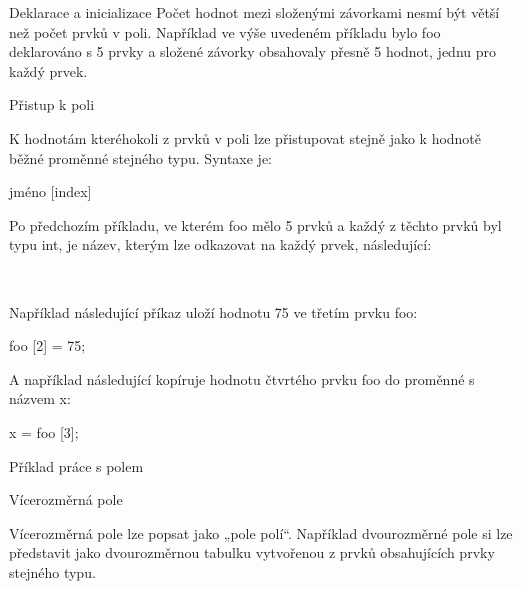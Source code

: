 \documentclass{beamer}
\begin{document}
\begin{frame}{Deklarace a inicializace}
    Počet hodnot mezi složenými závorkami nesmí být větší než počet prvků v poli. Například ve výše uvedeném příkladu bylo foo deklarováno s 5 prvky a složené závorky obsahovaly přesně 5 hodnot, jednu pro každý prvek.
\end{frame}

\begin{frame}{Přistup k poli}
    \begin{flushleft}
    K hodnotám kteréhokoli z prvků v poli lze přistupovat stejně jako k hodnotě běžné proměnné stejného typu. Syntaxe je:
        \begin{center}
            jméno [index]
        \end{center}
    Po předchozím příkladu, ve kterém foo mělo 5 prvků a každý z těchto prvků byl typu int, je název, kterým lze odkazovat na každý prvek, následující:
        \begin{center}
        \\[1em]
        \end{center}
    Například následující příkaz uloží hodnotu 75 ve třetím prvku foo:
        \begin{center}
            foo [2] = 75;
        \end{center}

    A například následující kopíruje hodnotu čtvrtého prvku foo do proměnné s názvem x:
        \begin{center}
            x = foo [3];
        \end{center}
    \end{flushleft}
\end{frame}

\begin{frame}{Příklad práce s polem}
    
\end{frame}



\begin{frame}{Vícerozměrná pole}
    \begin{flushleft}
        Vícerozměrná pole lze popsat jako „pole polí“.
        Například dvourozměrné pole si lze představit jako dvourozměrnou tabulku vytvořenou z prvků obsahujících prvky stejného typu.
        \begin{center}
            \\[1em]
        \end{center}\textbf{}
    \end{flushleft}
\end{frame}
\end{document}
